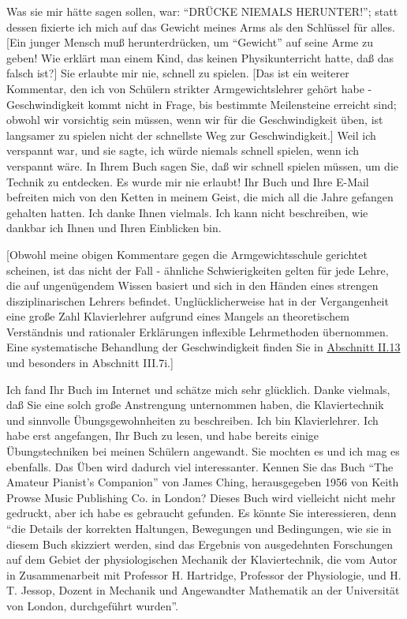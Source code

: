Was sie mir hätte sagen sollen, war: \enquote{DRÜCKE NIEMALS HERUNTER!}; statt dessen fixierte ich mich auf das Gewicht meines Arms als den Schlüssel für alles.
[Ein junger Mensch muß herunterdrücken, um \enquote{Gewicht} auf seine Arme zu geben!
Wie erklärt man einem Kind, das keinen Physikunterricht hatte, daß das falsch ist?]
Sie erlaubte mir nie, schnell zu spielen.
[Das ist ein weiterer Kommentar, den ich von Schülern strikter Armgewichtslehrer gehört habe - Geschwindigkeit kommt nicht in Frage, bis bestimmte Meilensteine erreicht sind; obwohl wir vorsichtig sein müssen, wenn wir für die Geschwindigkeit üben, ist langsamer zu spielen nicht der schnellste Weg zur Geschwindigkeit.]
Weil ich verspannt war, und sie sagte, ich würde niemals schnell spielen, wenn ich verspannt wäre.
In Ihrem Buch sagen Sie, daß wir schnell spielen müssen, um die Technik zu entdecken.
Es wurde mir nie erlaubt!
Ihr Buch und Ihre E-Mail befreiten mich von den Ketten in meinem Geist, die mich all die Jahre gefangen gehalten hatten.
Ich danke Ihnen vielmals.
Ich kann nicht beschreiben, wie dankbar ich Ihnen und Ihren Einblicken bin.

[Obwohl meine obigen Kommentare gegen die Armgewichtsschule gerichtet scheinen, ist das nicht der Fall - ähnliche Schwierigkeiten gelten für jede Lehre, die auf ungenügendem Wissen basiert und sich in den Händen eines strengen disziplinarischen Lehrers befindet.
Unglücklicherweise hat in der Vergangenheit eine große Zahl Klavierlehrer aufgrund eines Mangels an theoretischem Verständnis und rationaler Erklärungen inflexible Lehrmethoden übernommen.
Eine systematische Behandlung der Geschwindigkeit finden Sie in \hyperref[c1ii13]{Abschnitt II.13} und besonders in Abschnitt III.7i.]


\item \label{testimonials07}
Ich fand Ihr Buch im Internet und schätze mich sehr glücklich.
Danke vielmals, daß Sie eine solch große Anstrengung unternommen haben, die Klaviertechnik und sinnvolle Übungsgewohnheiten zu beschreiben.
Ich bin Klavierlehrer.
Ich habe erst angefangen, Ihr Buch zu lesen, und habe bereits einige Übungstechniken bei meinen Schülern angewandt.
Sie mochten es und ich mag es ebenfalls.
Das Üben wird dadurch viel interessanter.
Kennen Sie das Buch \enquote{The Amateur Pianist's Companion} von James Ching, herausgegeben 1956 von Keith Prowse Music Publishing Co. in London?
Dieses Buch wird vielleicht nicht mehr gedruckt, aber ich habe es gebraucht gefunden.
Es könnte Sie interessieren, denn \enquote{die Details der korrekten Haltungen, Bewegungen und Bedingungen, wie sie in diesem Buch skizziert werden, sind das Ergebnis von ausgedehnten Forschungen auf dem Gebiet der physiologischen Mechanik der Klaviertechnik, die vom Autor in Zusammenarbeit mit Professor H. Hartridge, Professor der Physiologie, und H. T. Jessop, Dozent in Mechanik und Angewandter Mathematik an der Universität von London, durchgeführt wurden}.


